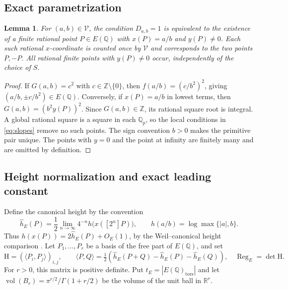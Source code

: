 \documentclass[11pt]{article}
\newtheorem{lemma}[theorem]{Lemma}
\newcommand{\Q}{\mathbb{Q}}
\newcommand{\R}{\mathbb{R}}
\newcommand{\Z}{\mathbb{Z}}
\newcommand{\calV}{\mathcal{V}}
\newcommand{\Reg}{\operatorname{Reg}}
\newcommand{\vol}{\operatorname{vol}}
\begin{document}
\subsection{Exact parametrization}
\begin{lemma}\label{lem:points}
For $(a,b)\in\calV$, the condition $D_{a,b}=1$ is equivalent to the existence of a finite rational point $P\in E(\Q)$ with $x(P)=a/b$ and $y(P)\ne0$.  Each such rational $x$-coordinate is counted once by $\calV$ and corresponds to the two points $P,-P$.  All rational finite points with $y(P)\ne0$ occur, independently of the choice of $S$.
\end{lemma}
\begin{proof}
If $G(a,b)=c^2$ with $c\in\Z\setminus\{0\}$, then
$f(a/b)=(c/b^2)^2$, giving $(a/b,\pm c/b^2)\in E(\Q)$.
Conversely, if $x(P)=a/b$ in lowest terms, then
$G(a,b)=(b^2y(P))^2$.  Since $G(a,b)\in\Z$, its rational square root is integral.  A global rational square is a square in each $\Q_p$, so the local conditions in \eqref{eq:slopes} remove no such points.  The sign convention $b>0$ makes the primitive pair unique.  The points with $y=0$ and the point at infinity are finitely many and are omitted by definition.
\end{proof}

\subsection{Height normalization and exact leading constant}
Define the canonical height by the convention
\begin{equation}\label{eq:height-convention}
 \widehat h_E(P)=\frac12\lim_{n\to\infty}4^{-n}
 h\bigl(x([2^n]P)\bigr),\qquad
 h(a/b)=\log\max\{|a|,b\}.
\end{equation}
Thus $h(x(P))=2\widehat h_E(P)+O_E(1)$, by the Weil--canonical height comparison \cite{SilvermanHeight}.  Let $P_1,\ldots,P_r$ be a basis of the free part of $E(\Q)$, and set
\[
 \mathrm H=(\langle P_i,P_j\rangle)_{i,j},\qquad
 \langle P,Q\rangle=\tfrac12(\widehat h_E(P+Q)-\widehat h_E(P)-\widehat h_E(Q)),
\quad \Reg_E=\det\mathrm H.
\]
For $r>0$, this matrix is positive definite.  Put $t_E=|E(\Q)_{\mathrm{tors}}|$ and let $\vol(B_r)=\pi^{r/2}/\Gamma(1+r/2)$ be the volume of the unit ball in $\R^r$.
\end{document}
